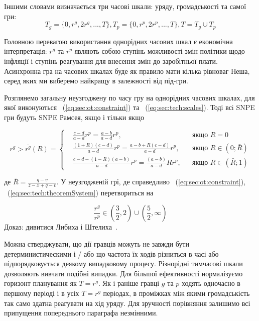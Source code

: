 Іншими словами визначається три часові шкали: уряду, громадськості та самої гри:
\begin{equation}
\label{eq:sec:tech:scales}
T_g = \{0,r^g,2r^g,...,T\}, T_p=\{0,r^p,2r^p,...,T\}, T=T_g\cup T_p 
\end{equation}

Головною перевагою використання однорідних часових шкал є економічна інтерпретація: $r^g$ та $r^p$ являють собою ступінь можливості змін політики щодо інфляції і ступінь реагування для внесення змін до заробітньої плати.
\\

Асинхронна гра на часових шкалах буде як правило мати кілька рівноваг Неша, серед яких ми виберемо найкращу в залежності від під-гри.

\begin{theorem}
Розглянемо загальну неузгоджену по часу гру на однорідних часових шкалах, для якої виконуються ~(\ref{eq:sec:ot:constraint}) та ~(\ref{eq:sec:tech:scales}). Тоді всi SNPE гри будуть SNPE Рамсея, якщо і тільки якщо
	
	\begin{equation}
	\label{eq:sec:tech:theoremSystem}
	r^g> \bar{r^g}(R) = \left\{ 
	\begin{aligned} 
	&\frac{c - d}{a-d}r^p= \frac{a-b}{a-d}r^p, &&\text{якщо } R=0
	\\
	&\frac{(1+R)(c-d)}{a-d}r^p= \frac{a-b + R(c-d)}{a-d}r^p, &&\text{якщо } 	R\in(0; \bar{R})
	\\
	&\frac{c-d-(1-R)(a-b)}{a-d}r^p= \frac{(a-b)}{a-d}Rr^p, &&\text{якщо } 	R\in(\bar{R};1)
	\end{aligned}
	\right.		
	\end{equation}
\end{theorem}
де $\bar{R}=\frac{q-v}{z-x+q-v}$. У неузгодженiй грі, де справедливо ~(\ref{eq:sec:ot:constraint}),  ~(\ref{eq:sec:tech:theoremSystem}) перетвориться на

\begin{equation}
\frac{r^g}{r^p} \in \left(\frac{3}{2}, 2\right)\cup \left(\frac{5}{2}, \infty\right)
\end{equation}
Доказ: дивитися Либиха і Штелиха~\cite{libichIncorpo}.


Можна стверджувати, що дії гравців можуть не завжди бути детерминистическими і / або що частота їх ходів різниться в часі або підпорядковується деякому випадковому процесу. Різнорідні тимчасові шкали дозволяють вивчати подібні випадки. Для більшої ефективності нормалізуємо горизонт планування як $T = r^g$. Як і раніше гравці $g$ та $p$ ходять одночасно в першому періоді і в усіх $T = r^g$ періодах, в проміжках між якими громадськість так само здатна реагувати на хід уряду. Для зручності порівняння залишимо всі припущення попереднього параграфа незмінними.

